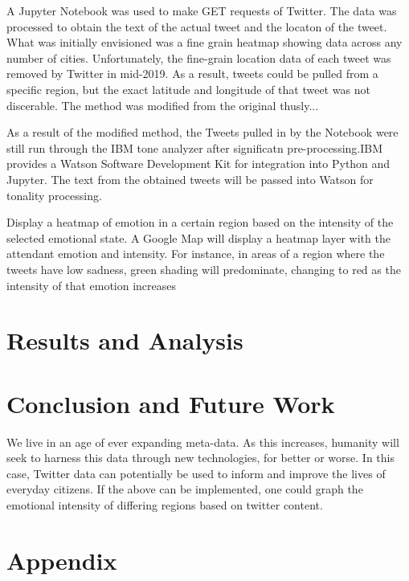 \documentclass[12pt, oneside]{article}
\begin{document}
 A Jupyter Notebook was used to make GET requests of Twitter. The
 data was processed to obtain the text of the actual tweet and the locaton of
 the tweet. What was initially envisioned was a fine grain heatmap showing data
 across any number of cities. Unfortunately, the fine-grain location data of
 each tweet was removed by Twitter in mid-2019. As a result, tweets could be
 pulled from a specific region, but the exact latitude and longitude of that
 tweet was not discerable. The method was modified from the original thusly...


 As a result of the modified method, the Tweets pulled in by the Notebook were
 still run through the IBM tone analyzer after significatn pre-processing.IBM provides a Watson Software
 Development Kit for integration into Python and Jupyter. The text from the
 obtained tweets will be passed into Watson for tonality processing.

 Display a heatmap of emotion in a certain region based on the intensity
 of the selected emotional state. A Google
 Map will display a heatmap layer with the attendant emotion and intensity. For
 instance, in areas of a region where the tweets have low sadness, green shading
 will predominate, changing to red as the intensity of that emotion increases


\section{Results and Analysis}


\section{Conclusion and Future Work}
We live in an age of ever expanding meta-data. As this increases, humanity will
seek to harness this data through new technologies, for better or worse. In
this case, Twitter data can potentially be used to inform and improve the lives
of everyday citizens. If the above can be implemented, one could graph
the emotional intensity of differing regions based on twitter content.

\newpage{}


%


\newpage{}
\section{Appendix}
\end{document}
